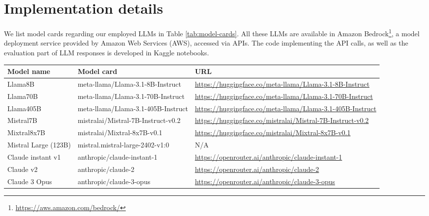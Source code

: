 \newpage
\section{Implementation details}
\label{sec:cards}

We list model cards regarding our employed LLMs in Table \ref{tab:model-cards}. All these LLMs are available in Amazon Bedrock\footnote{\href{https://aws.amazon.com/bedrock/}{https://aws.amazon.com/bedrock/}}, a model deployment service provided by Amazon Web Services (AWS),  accessed via APIs. The code implementing the API calls, as well as the evaluation part of LLM responses is developed in Kaggle notebooks.
\begin{table*}[h!]
\centering \small
\begin{tabular}{p{3.4cm}|p{4.7cm}p{6.7cm}}
\hline
Model name & Model card & URL\\
\hline
Llama8B&  meta-llama/Llama-3.1-8B-Instruct & \href{https://huggingface.co/meta-llama/Llama-3.1-8B-Instruct}{https://huggingface.co/meta-llama/Llama-3.1-8B-Instruct}
\\\hline
Llama70B & meta-llama/Llama-3.1-70B-Instruct & \href{https://huggingface.co/meta-llama/Llama-3.1-70B-Instruct}{https://huggingface.co/meta-llama/Llama-3.1-70B-Instruct} \\\hline
Llama405B & meta-llama/Llama-3.1-405B-Instruct & \href{https://huggingface.co/meta-llama/Llama-3.1-405B-Instruct}{https://huggingface.co/meta-llama/Llama-3.1-405B-Instruct} \\\hline
Mistral7B & mistralai/Mistral-7B-Instruct-v0.2 & \href{https://huggingface.co/mistralai/Mistral-7B-Instruct-v0.2}{https://huggingface.co/mistralai/Mistral-7B-Instruct-v0.2} \\\hline
Mixtral8x7B & mistralai/Mixtral-8x7B-v0.1 & \href{https://huggingface.co/mistralai/Mixtral-8x7B-v0.1}{https://huggingface.co/mistralai/Mixtral-8x7B-v0.1} \\\hline
Mistral Large (123B) & mistral.mistral-large-2402-v1:0& N/A\\\hline
Claude instant v1 & anthropic/claude-instant-1 & \href{https://openrouter.ai/anthropic/claude-instant-1}{https://openrouter.ai/anthropic/claude-instant-1} \\\hline
Claude v2 & anthropic/claude-2 & \href{https://openrouter.ai/anthropic/claude-2}{https://openrouter.ai/anthropic/claude-2}\\\hline
Claude 3 Opus & anthropic/claude-3-opus & \href{https://openrouter.ai/anthropic/claude-3-opus}{https://openrouter.ai/anthropic/claude-3-opus} \\\hline

\end{tabular}
\end{table*}
